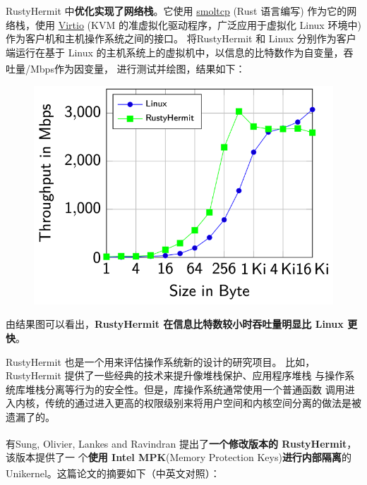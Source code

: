 \documentclass[UTF8,fontset=none,linespread=1.15]{ctexart}
\let\nosupcite\cite
\renewcommand*{\cite}[1]{\textsuperscript{\nosupcite{#1}}}
\begin{document}
RustyHermit 中\textbf{优化实现了网络栈}。它使用 \hyperlink{https://github.com/smoltcp-rs/smoltcp}{smoltcp} (Rust 语言编写)
作为它的网络栈，使用 \hyperlink{https://www.linux-kvm.org/page/Virtio}{Virtio}
(KVM 的准虚拟化驱动程序，广泛应用于虚拟化 Linux 环境中) 作为客户机和主机操作系统之间的接口。
将RustyHermit 和 Linux 分别作为客户端运行在基于 Linux 的主机系统上的虚拟机中，以信息的比特数作为自变量，吞吐量/Mbps作为因变量，
进行测试并绘图，结果如下：\cite{bib:20-linux-kernel}
\begin{figure}[H]
\includegraphics[width=\linewidth]{pictures/RustyHermit-1.png}
\caption{}
\end{figure}

由结果图可以看出，\textbf{RustyHermit 在信息比特数较小时吞吐量明显比 Linux 更快}。

RustyHermit 也是一个用来评估操作系统新的设计的研究项目。
比如，RustyHermit 提供了一些经典的技术来提升像堆栈保护、应用程序堆栈
与操作系统库堆栈分离等行为的安全性。但是，库操作系统通常使用一个普通函数
调用进入内核，传统的通过进入更高的权限级别来将用户空间和内核空间分离的做法是被遗漏了的。

有Sung, Olivier, Lankes and Ravindran\cite{bib:18-intra-unikernel}
提出了\textbf{一个修改版本的 RustyHermit}，该版本提供了一
个\textbf{使用 Intel MPK}(Memory Protection Keys)\textbf{进行内部隔离}的
Unikernel。这篇论文的摘要如下（中英文对照）：\cite{bib:19-mpk}
\end{document}
